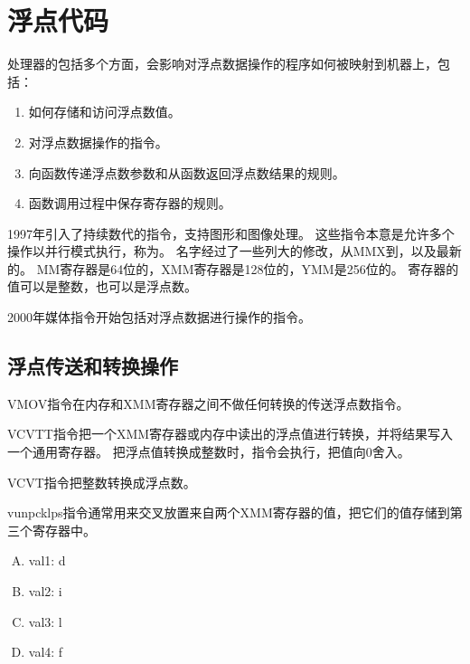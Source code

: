 
\section{浮点代码}
{
    处理器的包括多个方面，会影响对浮点数据操作的程序如何被映射到机器上，包括：

    \begin{enumerate}
        \item 如何存储和访问浮点数值。
        \item 对浮点数据操作的指令。
        \item 向函数传递浮点数参数和从函数返回浮点数结果的规则。
        \item 函数调用过程中保存寄存器的规则。
    \end{enumerate}

    1997年引入了持续数代的指令，支持图形和图像处理。
    这些指令本意是允许多个操作以并行模式执行，称为。
    名字经过了一些列大的修改，从MMX到，以及最新的。
    MM寄存器是64位的，XMM寄存器是128位的，YMM是256位的。
    寄存器的值可以是整数，也可以是浮点数。

    2000年媒体指令开始包括对浮点数据进行操作的指令。

    \subsection{浮点传送和转换操作}
    {
        VMOV指令在内存和XMM寄存器之间不做任何转换的传送浮点数指令。

        VCVTT指令把一个XMM寄存器或内存中读出的浮点值进行转换，并将结果写入一个通用寄存器。
        把浮点值转换成整数时，指令会执行，把值向0舍入。

        VCVT指令把整数转换成浮点数。

        vunpcklps指令通常用来交叉放置来自两个XMM寄存器的值，把它们的值存储到第三个寄存器中。

        \begin{practicec}
            \begin{enumerate}[A.]
                \item val1: d
                \item val2: i
                \item val3: l
                \item val4: f
            \end{enumerate}
        \end{practicec}

}}
